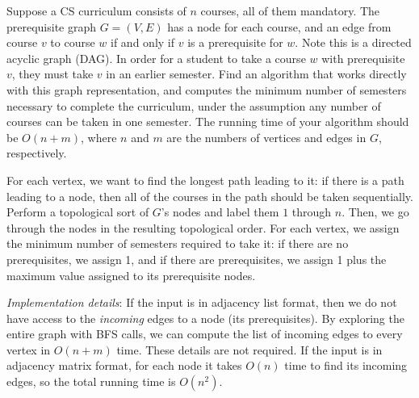   \begin{exercise}[DPV 3.16]
    Suppose a CS curriculum consists of $n$ courses, all of them mandatory. The prerequisite graph $G = (V,E)$ has a node for each course, and an edge from course $v$ to course $w$ if and only if $v$ is a prerequisite for $w$. Note this is a directed acyclic graph (DAG). In order for a student to take a course $w$ with prerequisite $v$, they must take $v$ in an earlier semester. Find an algorithm that works directly with this graph representation, and computes the minimum number of semesters necessary to complete the curriculum, under the assumption any number of courses can be taken in one semester. The running time of your algorithm should be $O(n+m)$, where $n$ and $m$ are the numbers of vertices and edges in $G$, respectively.
  \end{exercise}
  \begin{solution}
    For each vertex, we want to find the longest path leading to it: if there is a path leading to a node, then all of the courses in the path should be taken sequentially. Perform a topological sort of $G$'s nodes and label them $1$ through $n$. Then, we go through the nodes in the resulting topological order. For each vertex, we assign the minimum number of semesters required to take it: if there are no prerequisites, we assign 1, and if there are prerequisites, we assign 1 plus the maximum value assigned to its prerequisite nodes.
    
    \textit{Implementation details}: If the input is in adjacency list format, then we do not have access to the \emph{incoming} edges to a node (its prerequisites). By exploring the entire graph with BFS calls, we can compute the list of incoming edges to every vertex in $O(n+m)$ time. These details are not required. If the input is in adjacency matrix format, for each node it takes $O(n)$ time to find its incoming edges, so the total running time is $O(n^2)$.
  \end{solution}

